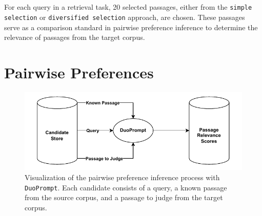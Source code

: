 \\\\
For each query in a retrieval task, 20 selected passages, either from the \texttt{simple selection} or \texttt{diversified selection} approach, are chosen. These passages serve as a comparison standard in pairwise preference inference to determine the relevance of passages from the target corpus.
\pagebreak

\section{Pairwise Preferences}\label{pairwise-transfering-relevance-labels-across-datasets}

\begin{figure}[t]
    \centering
    \includegraphics[width=\textwidth]{./graphics/drawio/pairwise_preferences.pdf}
    \caption{Visualization of the pairwise preference inference process with \texttt{DuoPrompt}. Each candidate consists of a query, a known passage from the source corpus, and a passage to judge from the target corpus.}
    \label{fig:pairwise-preferences}
\end{figure}

